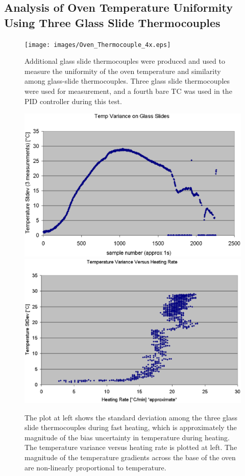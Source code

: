 \documentclass[12pt,oneside,english]{article}
\begin{document}
	
\subsection{Analysis of Oven Temperature Uniformity Using Three Glass Slide Thermocouples}
\label{sec:Temperature_Uniformity_Three_Slides}

	\begin{figure}
		\texttt{[image: images/Oven\_Thermocouple\_4x.eps]}
		\caption{Additional glass slide thermocouples were produced and used to measure the uniformity of the oven temperature and similarity among glass-slide thermocouples.  Three glass slide thermocouples were used for measurement, and a fourth bare TC was used in the PID controller during this test.}
	\end{figure}
	\begin{figure}
		\includegraphics[width=140mm]{images/heating_data.eps}
		\includegraphics[width=140mm]{images/variance_vs_rate.eps}
		\caption{The plot at left shows the standard deviation among the three glass slide thermocouples during fast heating, which is approximately the magnitude of the bias uncertainty in temperature during heating.  The temperature variance versus heating rate is plotted at left.  The magnitude of the temperature gradients across the base of the oven are non-linearly proportional to temperature.}
	\end{figure}
	
\end{document}
